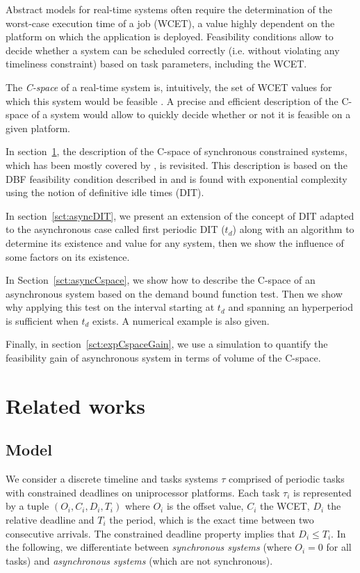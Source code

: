 \documentclass[conference]{IEEEtran}
\begin{document}
	Abstract models for real-time systems often require the determination of the
	worst-case execution time of a job (WCET), a value highly dependent on the
	platform on which the application is deployed. Feasibility conditions allow to
	decide whether a system can be scheduled correctly (i.e. without violating any
	timeliness constraint) based on task parameters, including the WCET.

	The \emph{C-space} of a real-time system is, intuitively,
	the set of WCET values for which this system would be feasible
	\cite{bini2004schedulability,george2009characterization}. A precise and efficient description of the C-space of a system would allow to quickly decide
	whether or not it is feasible on a given platform.

	In section~\ref{sct:relatedWorks}, the description of the C-space of synchronous
	constrained systems, which has been mostly covered by \cite{george2009characterization}, is revisited.
	This description is based on the DBF feasibility condition described in
	\cite{baruah1999generalized,baruah1990algorithms} and is found with exponential complexity using
	the notion of definitive idle times (DIT).

	In section~\ref{sct:asyncDIT}, we present an extension of the concept of DIT adapted to the
	asynchronous case called first periodic DIT
	($t_d$) along with an algorithm to determine its existence and value for any system,
	then we show the influence of some factors on its existence.

	In Section~\ref{sct:asyncCspace}, we show how to describe the C-space of an asynchronous
	system based on the demand bound function test. Then we show why applying this
	test on the interval starting at $t_d$
	and spanning an hyperperiod is sufficient when $t_d$ exists. A
	numerical example is also given.

	Finally, in section~\ref{sct:expCspaceGain}, we use a simulation to quantify the feasibility
	gain of asynchronous system in terms of volume of the C-space.

\section{Related works}
\label{sct:relatedWorks}


	\subsection{Model}
		We consider a discrete timeline and tasks systems $\tau$ comprised of periodic
		tasks with constrained deadlines on uniprocessor platforms. Each task
		$\tau_i$ is represented by a tuple $(O_i, C_i, D_i, T_i)$ where $O_i$ is the offset value,
		$C_i$ the WCET, $D_i$ the relative deadline and $T_i$ the period, which is the exact time between two consecutive arrivals.
		The constrained deadline property implies that $D_i \leq T_i$. In
		the following, we differentiate between \emph{synchronous systems} (where $O_i
		= 0$ for all tasks) and \emph{asynchronous systems} (which are not synchronous).
\end{document}
